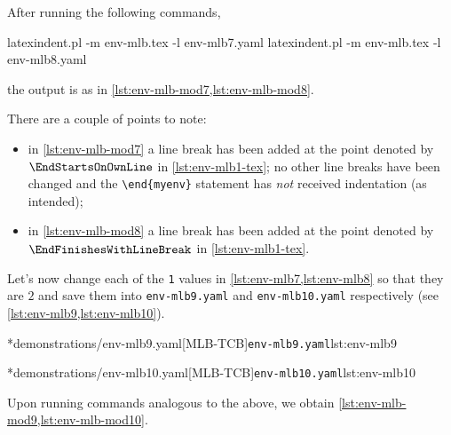	After running the following commands, \begin{commandshell}
latexindent.pl -m env-mlb.tex -l env-mlb7.yaml
latexindent.pl -m env-mlb.tex -l env-mlb8.yaml
\end{commandshell} the output is as in \cref{lst:env-mlb-mod7,lst:env-mlb-mod8}.

	\begin{widepage}
		\begin{minipage}{.42\linewidth}
		\end{minipage}
		\hfill
		\begin{minipage}{.57\linewidth}
		\end{minipage}
	\end{widepage}

	There are a couple of points to note: \begin{itemize} \item in \cref{lst:env-mlb-mod7} a line break has been added at the point denoted by $\EndStartsOnOwnLine$ in \vref{lst:env-mlb1-tex}; no other line breaks have been changed and the \lstinline!\end{myenv}! statement has \emph{not} received indentation (as intended);
		\item in \cref{lst:env-mlb-mod8} a line break has been added at the point denoted by $\EndFinishesWithLineBreak$ in \vref{lst:env-mlb1-tex}.
	\end{itemize}

	Let's now change each of the \texttt{1} values in \cref{lst:env-mlb7,lst:env-mlb8} so that they are $2$ and save them into \texttt{env-mlb9.yaml} and \texttt{env-mlb10.yaml} respectively (see \cref{lst:env-mlb9,lst:env-mlb10}).

	\begin{minipage}{.49\textwidth}
		\cmhlistingsfromfile[style=yaml-LST]*{demonstrations/env-mlb9.yaml}[MLB-TCB]{\texttt{env-mlb9.yaml}}{lst:env-mlb9}
	\end{minipage}
	\hfill
	\begin{minipage}{.49\textwidth}
		\cmhlistingsfromfile[style=yaml-LST]*{demonstrations/env-mlb10.yaml}[MLB-TCB]{\texttt{env-mlb10.yaml}}{lst:env-mlb10}
	\end{minipage}

	Upon running  commands analogous to the above, we obtain \cref{lst:env-mlb-mod9,lst:env-mlb-mod10}.

